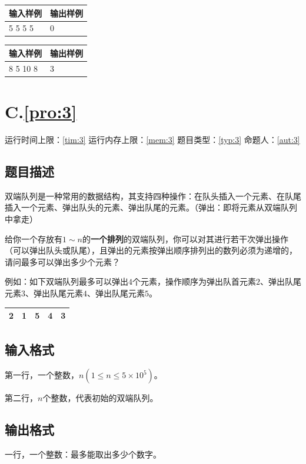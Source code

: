 \documentclass[
	lang=cn,
	color=green
]{elegantbook}
\begin{document}
\begin{tabularx}{450pt}{X|X}
	\toprule
	输入样例 & 输出样例 \\
	\midrule
	5 5 5 5  & 0        \\
	\bottomrule
\end{tabularx}
\vspace{0.5cm}

\begin{tabularx}{450pt}{X|X}
	\toprule
	输入样例 & 输出样例 \\
	\midrule
	8 5 10 8 & 3        \\
	\bottomrule
\end{tabularx}

\newpage
\chapter*{C.\quad \ref*{pro:3}}
\begin{center}
	运行时间上限：\ref*{tim:3} \quad 运行内存上限：\ref*{mem:3} \quad 题目类型：\ref*{typ:3} \quad 命题人：\ref*{aut:3}
\end{center}

\section*{题目描述}
双端队列是一种常用的数据结构，其支持四种操作：在队头插入一个元素、在队尾插入一个元素、弹出队头的元素、弹出队尾的元素。（弹出：即将元素从双端队列中拿走）

给你一个存放有$1 \sim n$的\textbf{一个排列}的双端队列，你可以对其进行若干次弹出操作（可以弹出队头或队尾），且弹出的元素按弹出顺序排列出的数列必须为递增的，请问最多可以弹出多少个元素？

例如：如下双端队列最多可以弹出$4$个元素，操作顺序为弹出队首元素$2$、弹出队尾元素$3$、弹出队尾元素$4$、弹出队尾元素$5$。

\begin{tabularx}{200pt}{X|X|X|X|X}
	\toprule
	2 & 1 & 5 & 4 & 3 \\
	\bottomrule
\end{tabularx}

\section*{输入格式}
第一行，一个整数，$n(1 \leq n \leq 5 \times 10^5)$。

第二行，$n$个整数，代表初始的双端队列。

\section*{输出格式}
一行，一个整数：最多能取出多少个数字。
\end{document}
